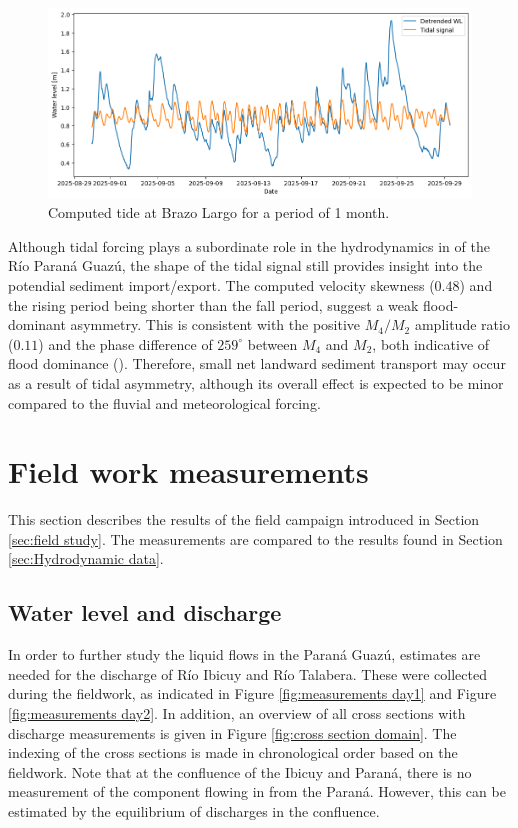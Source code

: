\begin{figure}[H]
    \centering
    \includegraphics[width=1\linewidth]{figures/ch6/Tide_BL_1month.png}
    \caption{Computed tide at Brazo Largo for a period of 1 month.}
    \label{fig: Tide 1 month Brazo Largo}
\end{figure}

Although tidal forcing plays a subordinate role in the hydrodynamics in of the Río Paraná Guazú, the shape of the tidal signal still provides insight into the potendial sediment import/export. The computed velocity skewness ($0.48$) and the rising period being shorter than the fall period, suggest a weak flood-dominant asymmetry. This is consistent with the positive $M_4/M_2$ amplitude ratio ($0.11$) and the phase difference of $259^\circ$ between $M_4$ and $M_2$, both indicative of flood dominance (\autocite{bosboomCoastalDynamics}). Therefore, small net landward sediment transport may occur as a result of tidal asymmetry, although its overall effect is expected to be minor compared to the fluvial and meteorological forcing.


\newpage
\section{Field work measurements}
This section describes the results of the field campaign introduced in Section \ref{sec:field study}. The measurements are compared to the results found in Section \ref{sec:Hydrodynamic data}.


\subsection{Water level and discharge}
In order to further study the liquid flows in the Paraná Guazú, estimates are needed for the discharge of Río Ibicuy and Río Talabera. These were collected during the fieldwork, as indicated in Figure \ref{fig:measurements day1} and Figure \ref{fig:measurements day2}. In addition, an overview of all cross sections with discharge measurements is given in Figure \ref{fig:cross section domain}. The indexing of the cross sections is made in chronological order based on the fieldwork. Note that at the confluence of the Ibicuy and Paraná, there is no measurement of the component flowing in from the Paraná. However, this can be estimated by the equilibrium of discharges in the confluence. 

